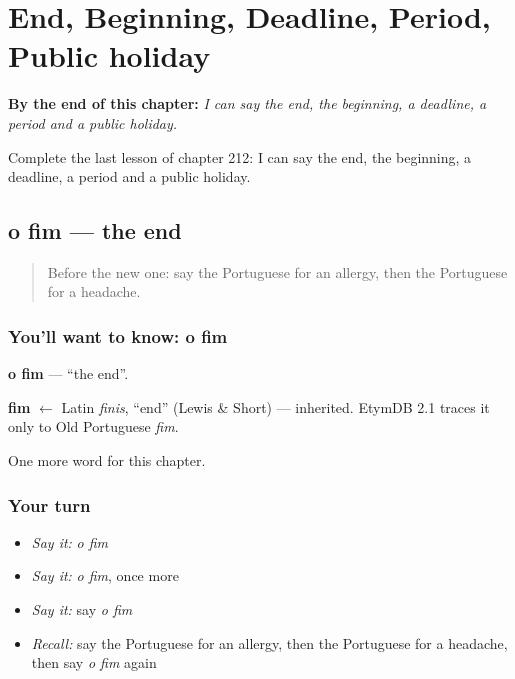 
\chapter{End, Beginning, Deadline, Period, Public holiday}
\label{ch:pt-end-beginning-deadline-period-public-holiday}

\begin{chapteropening}
\textbf{By the end of this chapter:} \emph{I can say the end, the beginning, a deadline, a period and a public holiday.}

Complete the last lesson of chapter 212: I can say the end, the beginning, a deadline, a period and a public holiday.
\end{chapteropening}

\section[o fim]{o fim — the end}

\label{lesson:PT-C212-fim}



\begin{quote}
Before the new one: say the Portuguese for an allergy, then the Portuguese for a headache.
\end{quote}

\subsection*{You'll want to know: o fim}
\textbf{o fim} — \textquotedblleft{}the end\textquotedblright{}.

\begin{cousinweb}
\textbf{fim} $\leftarrow$ Latin \emph{finis}, \textquotedblleft{}end\textquotedblright{} (Lewis \& Short) — inherited. EtymDB 2.1 traces it only to Old Portuguese \emph{fim}.
\end{cousinweb}

\begin{grammarlens}[title={What you've built}]
One more word for this chapter.
\end{grammarlens}

\subsection*{Your turn}
\begin{itemize}
\raggedright
  \item \emph{Say it:} \emph{o fim}
  \item \emph{Say it:} \emph{o fim}, once more
  \item \emph{Say it:} say \emph{o fim}
  \item \emph{Recall:} say the Portuguese for an allergy, then the Portuguese for a headache, then say \emph{o fim} again
\end{itemize}

